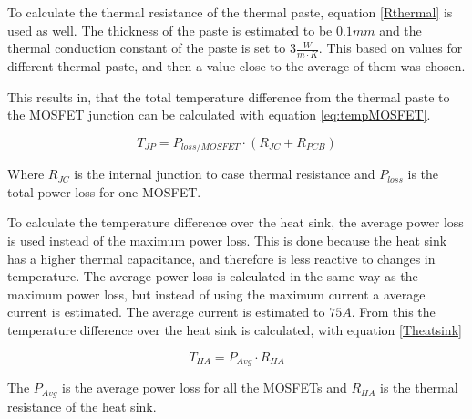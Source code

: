 To calculate the thermal resistance of the thermal paste, equation \ref{Rthermal} is used as well. The thickness of the paste is estimated to be $0.1 mm$ and the thermal conduction constant of the paste is set to $3 \frac{W}{m \cdot K}$. This based on values for different thermal paste, and then a value close to the average of them was chosen.

This results in, that the total temperature difference from the thermal paste to the MOSFET junction can be calculated with equation \ref{eq:tempMOSFET}.

    \begin{equation}
        T_{JP} = P_{loss/MOSFET} \cdot (R_{JC} + R_{PCB})
        \label{eq:tempMOSFET}
    \end{equation}
    
Where $R_{JC}$ is the internal junction to case thermal resistance and $P_{loss}$ is the total power loss for one MOSFET. 

To calculate the temperature difference over the heat sink, the average power loss is used instead of the maximum power loss. This is done because the heat sink has a higher thermal capacitance, and therefore is less reactive to changes in temperature. The average power loss is calculated in the same way as the maximum power loss, but instead of using the maximum current a average current is estimated. The average current is estimated to $75 A$.
From this the temperature difference over the heat sink is calculated, with equation \ref{Theatsink} 

    \begin{equation}
        T_{HA} = P_{Avg} \cdot R_{HA}
        \label{Theatsink}
    \end{equation}

The $P_{Avg}$ is the average power loss for all the MOSFETs and $R_{HA}$ is the thermal resistance of the heat sink. 

